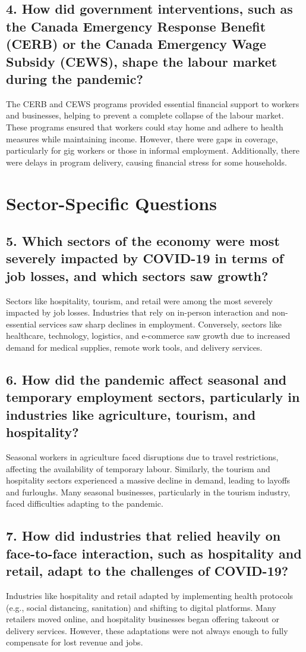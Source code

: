 \documentclass[12pt]{article}
\begin{document}
\subsection*{4. How did government interventions, such as the Canada Emergency Response Benefit (CERB) or the Canada Emergency Wage Subsidy (CEWS), shape the labour market during the pandemic?}
The CERB and CEWS programs provided essential financial support to workers and businesses, helping to prevent a complete collapse of the labour market. These programs ensured that workers could stay home and adhere to health measures while maintaining income. However, there were gaps in coverage, particularly for gig workers or those in informal employment. Additionally, there were delays in program delivery, causing financial stress for some households.

\section*{Sector-Specific Questions}

\subsection*{5. Which sectors of the economy were most severely impacted by COVID-19 in terms of job losses, and which sectors saw growth?}
Sectors like hospitality, tourism, and retail were among the most severely impacted by job losses. Industries that rely on in-person interaction and non-essential services saw sharp declines in employment. Conversely, sectors like healthcare, technology, logistics, and e-commerce saw growth due to increased demand for medical supplies, remote work tools, and delivery services.

\subsection*{6. How did the pandemic affect seasonal and temporary employment sectors, particularly in industries like agriculture, tourism, and hospitality?}
Seasonal workers in agriculture faced disruptions due to travel restrictions, affecting the availability of temporary labour. Similarly, the tourism and hospitality sectors experienced a massive decline in demand, leading to layoffs and furloughs. Many seasonal businesses, particularly in the tourism industry, faced difficulties adapting to the pandemic.

\subsection*{7. How did industries that relied heavily on face-to-face interaction, such as hospitality and retail, adapt to the challenges of COVID-19?}
Industries like hospitality and retail adapted by implementing health protocols (e.g., social distancing, sanitation) and shifting to digital platforms. Many retailers moved online, and hospitality businesses began offering takeout or delivery services. However, these adaptations were not always enough to fully compensate for lost revenue and jobs.
\end{document}
